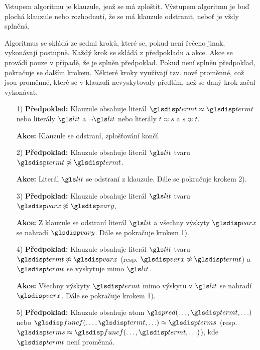Vstupem algoritmu je klauzule, jenž se má zploštit.
Výstupem algoritmu je buď plochá klauzule nebo rozhodnutí,
že se má klauzule odstranit, neboť je vždy splněná.

Algoritmus se skládá ze sedmi kroků, které se, pokud
není řečeno jinak, vykonávají postupně.
Každý krok se skládá z předpokladu a akce.
Akce se provádí pouze v případě, že je splněn předpoklad.
Pokud není splněn předpoklad, pokračuje se dalším krokem.
Některé kroky využívají tzv. nové proměnné, což
jsou proměnné, které se v klauzuli nevyskytovaly
předtím, než se daný krok začal vykonávat.

{
\def\assumpt{\textbf{Předpoklad:}}
\def\action{\textbf{Akce:}}
\def\goto#1{Dále se pokračuje krokem #1).}
\begin{itemize}
\item[1)]
\assumpt{} Klauzule obsahuje literál $\term \approx \term$ nebo
literály $\lit$ a $\neg \lit$ nebo literály $t \approx s$
a $s \not\approx t$.

\action{} Klauzule se odstraní, zplošťování končí.

\item[2)]
\assumpt{} Klauzule obsahuje literál $\lit$ tvaru $\term \not\approx \term$.

\action{} Literál $\lit$ se odstraní z klauzule.
\goto{2}

\item[3)]
\assumpt{} Klauzule obsahuje literál
$\lit$ tvaru $\var \not\approx \varY$.

\action{} Z klauzule se odstraní literál $\lit$ a všechny
výskyty $\var$ se nahradí $\varY$.
\goto{1}


\item[4)]
\assumpt{} Klauzule obsahuje literál $\lit$ tvaru
$\term \not\approx \var$ (resp. $\var \not\approx \term$) a
$\term$ se vyskytuje mimo $\lit$.

\action{} Všechny výskyty $\term$ mimo výskytu v $\lit$ se nahradí $\var$.
\goto{1}


\item[5)]
\assumpt{} Klauzule obsahuje atom
$\pred(\ldots, \term, \ldots)$ nebo
$\func(\ldots, \term, \ldots) \approx \termS$
(resp. $\termS \approx \func(\ldots, \term, \ldots)$),
kde $\term$ není proměnná.


\end{itemize}}
